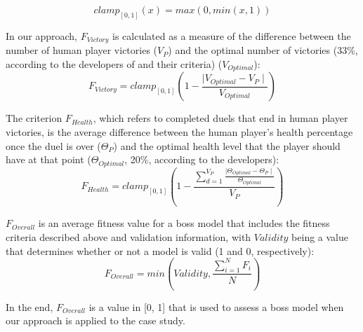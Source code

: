 \begin{equation}
clamp_{[0, 1]}( x ) = max ( 0, min ( x, 1 ) )
\end{equation}

In our approach, $F_{Victory}$ is calculated as a measure of the difference between the number of human player victories ($V_{P}$) and the optimal number of victories (33\%, according to the developers of \CaseStudy{} and their criteria) ($V_{Optimal}$):
\begin{equation}
F_{Victory} = clamp_{[0, 1]} \left ( 1 -\frac{\mid V_{Optimal} - V_{P} \mid}{ V_{Optimal}} \right )
\end{equation}

The criterion $F_{Health}$, which refers to completed duels that end in human player victories, is the average difference between the human player's health percentage once the duel is over ($\Theta_{P}$) and the optimal health level that the player should have at that point ($\Theta_{Optimal}$, 20\%, according to the developers):
\begin{equation}
F_{Health} = clamp_{[0, 1]} \left ( 1 - \frac{\sum\limits_{d=1}^{V_{P}}\frac{\mid \Theta_{Optimal} - \Theta_{P} \mid}{ \Theta_{Optimal}}}{V_{P}} \right )
\end{equation}

$F_{Overall}$ is an average fitness value for a boss model that includes the fitness criteria described above and validation information, with $Validity$ being a value that determines whether or not a model is valid (1 and 0, respectively):
\begin{equation}
F_{Overall} = min( Validity, \frac{\sum\limits_{i=1}^{N}F_{i}}{N} )
\end{equation}

In the end, $F_{Overall}$ is a value in [0, 1] that is used to assess a boss model when our \ApproachName{} approach is applied to the \CaseStudy{} case study.

